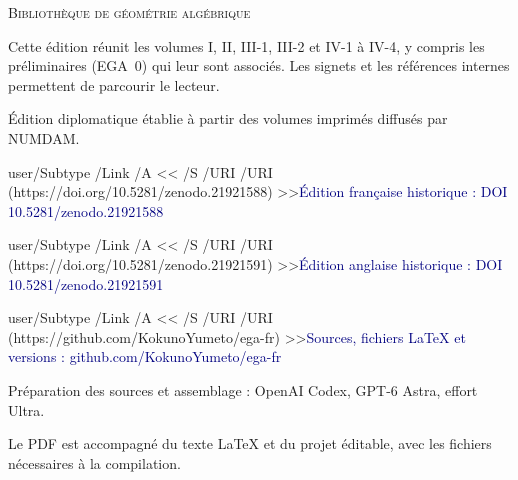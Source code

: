 \documentclass[11pt,a4paper]{article}
\newcommand{\editionlink}[2]{\leavevmode\pdfstartlink user{/Subtype /Link /A << /S /URI /URI (#1) >>}\textcolor{navy}{#2}\pdfendlink}
\begin{document}
\color{navy}
\noindent\textsc{Bibliothèque de géométrie algébrique}\par
\vspace{22mm}
\par
\vspace{9mm}
\par
\vspace{18mm}
\par
\vspace{3mm}
\par
\vspace{10mm}
\color{muted}
\noindent Cette édition réunit les volumes I, II, III-1, III-2 et IV-1 à IV-4,
y compris les préliminaires (EGA~0) qui leur sont associés.
Les signets et les références internes permettent de parcourir le lecteur.\par
\vspace{5mm}
\noindent Édition diplomatique établie à partir des volumes imprimés
diffusés par NUMDAM.\par
\vspace{9mm}
\noindent\editionlink{https://doi.org/10.5281/zenodo.21921588}{Édition française historique : DOI 10.5281/zenodo.21921588}\par
\vspace{3mm}
\noindent\editionlink{https://doi.org/10.5281/zenodo.21921591}{Édition anglaise historique : DOI 10.5281/zenodo.21921591}\par
\vspace{3mm}
\noindent\editionlink{https://github.com/KokunoYumeto/ega-fr}{Sources, fichiers LaTeX et versions : github.com/KokunoYumeto/ega-fr}\par
\vfill
\small
\noindent Préparation des sources et assemblage : OpenAI Codex,
GPT-6 Astra, effort Ultra.\par
\vspace{3mm}
\noindent Le PDF est accompagné du texte LaTeX et du projet éditable,
avec les fichiers nécessaires à la compilation.\par
\end{document}
